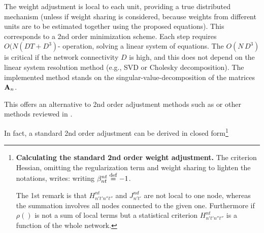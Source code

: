 The weight adjustment is local to each unit, providing a true distributed mechanism  (unless if weight sharing is considered, because weights from different units are to be estimated together using the proposed equations). This corresponds to a 2nd order minimization scheme. Each step requires $O(N (D T + D^3)$- operation, solving a linear system of equations. The $O(N\,D^3)$ is critical if the network connectivity $D$ is high, and this does not depend on the linear system resolution method (e.g., SVD or Cholesky decomposition). The implemented method stands on the singular-value-decomposition of the matrices ${\bf A}_n$.

This offers an alternative to 2nd order adjustment methods such as \cite{martens_learning_2016} or other methods reviewed in \cite{Goodfellow2016Deep}.

In fact, a standard 2nd order adjustment can be derived in closed form\footnote{{\bf Calculating the standard 2nd order weight adjustment.} The criterion Hessian, omitting the regularization term and weight sharing to lighten the notations, writes:
writing $\beta_{nt}^{nt} \stackrel {\rm def}{=} -1$. 

The 1st remark is that $H^{nt}_{n't'n''t''}$ and $J^{nd}_{n't'}$ are not local to one node, whereas the summation involves all nodes connected to the given one. Furthermore if $\rho()$ is not a sum of local terms but a statistical criterion $H^{nt}_{n't'n''t''}$ is a function of the whole network.

}
